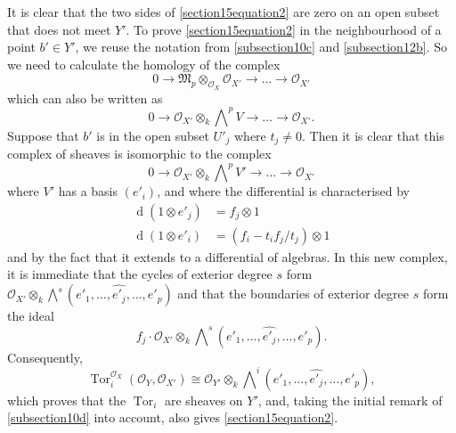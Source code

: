 \documentclass{article}
\theoremstyle{plain}
\theoremstyle{definition}
\newcommand{\sh}[1]{{\mathscr{#1}}}
\newcommand{\dd}{\operatorname{d}\!}
\DeclareMathOperator{\Tor}{Tor}
\begin{document}
It is clear that the two sides of \cref{section15equation2} are zero on an open subset that does not meet $Y'$.
To prove \cref{section15equation2} in the neighbourhood of a point $b'\in Y'$, we reuse the notation from \cref{subsection10c} and \cref{subsection12b}.
So we need to calculate the homology of the complex
\[
  0 \to \mathfrak{M}_p\otimes_{\sh{O}_X}\sh{O}_{X'} \to \ldots \to \sh{O}_{X'}
\]
which can also be written as
\[
  0 \to \sh{O}_{X'}\otimes_k\bigwedge\nolimits^p V \to \ldots \to \sh{O}_{X'}.
\]
Suppose that $b'$ is in the open subset $U'_j$ where $t_j\neq0$.
Then it is clear that this complex of sheaves is isomorphic to the complex
\[
  0 \to \sh{O}_{X'}\otimes_k\bigwedge\nolimits^p V' \to \ldots \to \sh{O}_{X'}
\]
where $V'$ has a basis $(e'_i)$, and where the differential is characterised by
\begin{align*}
  \dd(1\otimes e'_j) &= f_j\otimes1
\\\dd(1\otimes e'_i) &= (f_i-t_if_j/t_j)\otimes1
\end{align*}
and by the fact that it extends to a differential of algebras.
In this new complex, it is immediate that the cycles of exterior degree $s$ form $\sh{O}_{X'}\otimes_k\bigwedge\nolimits^s(e'_1,\ldots,\widehat{e'_j},\ldots,e'_p)$ and that the boundaries of exterior degree $s$ form the ideal
\[
  f_j\cdot\sh{O}_{X'}\otimes_k\bigwedge\nolimits^s(e'_1,\ldots,\widehat{e'_j},\ldots,e'_p).
\]
Consequently,
\[
  \Tor_i^{\sh{O}_X}(\sh{O}_Y,\sh{O}_{X'})
  \cong
  \sh{O}_{Y'}\otimes_k\bigwedge\nolimits^i(e'_1,\ldots,\widehat{e'_j},\ldots,e'_p),
\]
which proves that the $\Tor_i$ are sheaves on $Y'$, and, taking the initial remark of \cref{subsection10d} into account, also gives \cref{section15equation2}.
\end{document}
